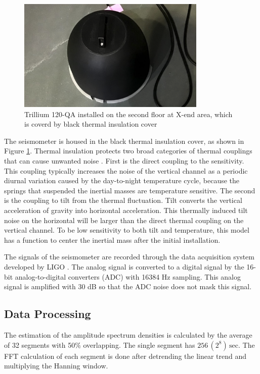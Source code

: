 \begin{figure}[h]
  \begin{center}   
    \includegraphics[width=9.0cm]{./img_chap3/img316.png}
    \caption{Trillium 120-QA installed on the second floor at X-end area, which is coverd by black thermal insulation cover}\label{img:img316}
  \end{center}
\end{figure}

The seismometer is housed in the black thermal insulation cover, as shown in Figure \ref{img:img316}. Thermal insulation protects two broad categories of thermal couplings that can cause unwanted noise \cite{trillium120manual}. First is the direct coupling to the sensitivity. This coupling typically increases the noise of the vertical channel as a periodic diurnal variation caused by the day-to-night temperature cycle, because the springs that suspended the inertial masses are temperature sensitive. The second is the coupling to tilt from the thermal fluctuation. Tilt converts the vertical acceleration of gravity into horizontal acceleration. This thermally induced tilt noise on the horizontal will be larger than the direct thermal coupling on the vertical channel. To be low sensitivity to both tilt and temperature, this model has a function to center the inertial mass after the initial installation.

The signals of the seismometer are recorded through the data acquisition system developed by LIGO \cite{bork2001overview}. The analog signal is converted to a digital signal by the 16-bit analog-to-digital converters (ADC) with 16384 $\mathrm{Hz}$ sampling. This analog signal is amplified with 30 dB so that the ADC noise does not mask this signal. 

\subsection{Data Processing}
The estimation of the amplitude spectrum densities is calculated by the average of 32 segments with 50\% overlapping. The single segment has $256\, (2^8)\,\mathrm{sec}$. The FFT calculation of each segment is done after detrending the linear trend and multiplying the Hanning window. 

